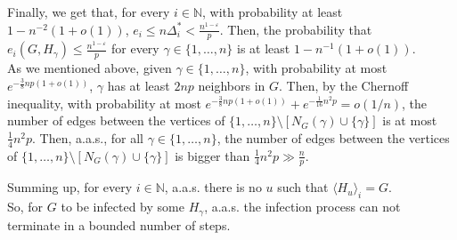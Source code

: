 \documentclass[]{article}
\begin{document}
Finally, we get that, for every $i\in\mathbb{N}$, with probability at least $1-n^{-2}(1+o(1))$, $e_i\leq n\Delta^*_i<\frac{n^{1-\varepsilon}}{p}$. Then, the probability that $e_i(G,H_{\gamma})\leq\frac{n^{1-\varepsilon}}{p}$ for every $\gamma\in\{1,\ldots,n\}$ is at least $1-n^{-1}(1+o(1))$.\\

As we mentioned above, given $\gamma\in\{1,\ldots,n\}$, with probability at most $e^{-\frac{3}{8}np(1+o(1))}$, $\gamma$ has at least $2np$ neighbors in $G$. Then, by the Chernoff inequality, with probability at most $e^{-\frac{3}{8}np(1+o(1))}+e^{-\frac{1}{16}n^2p}=o(1/n)$, the number of edges between the vertices of $\{1,\ldots,n\}\setminus[N_G(\gamma)\cup\{\gamma\}]$ is at most $\frac{1}{4}n^2p$. Then, a.a.s., for all $\gamma\in\{1,\ldots,n\}$, the number of edges between the vertices of $\{1,\ldots,n\}\setminus[N_G(\gamma)\cup\{\gamma\}]$ is bigger than $\frac{1}{4}n^2p\gg\frac{n}{p}$.

Summing up, for every $i\in\mathbb{N}$, a.a.s. there is no $u$ such that $\langle H_u\rangle_i=G$.\\

So, for $G$ to be infected by some $H_{\gamma}$, a.a.s. the infection process can not terminate in a bounded number of steps.
\end{document}
